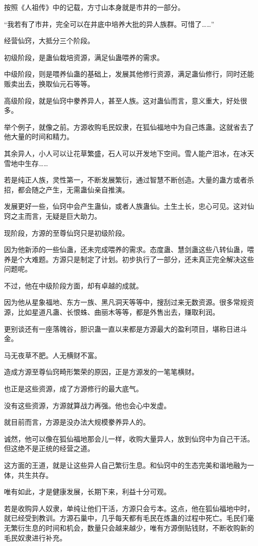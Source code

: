 \begin{this_body}
按照《人祖传》中的记载，方寸山本身就是市井的一部分。

“我若有了市井，完全可以在井底中培养大批的异人族群。可惜了……”

经营仙窍，大抵分三个阶段。

初级阶段，是蛊仙栽培资源，满足仙蛊喂养的需求。

中级阶段，则是喂养仙蛊的基础上，发展其他修行资源，满足蛊仙修行，同时还能贩卖出去，换取仙元石等等。

高级阶段，就是仙窍中豢养异人，甚至人族。这对蛊仙而言，意义重大，好处很多。

举个例子，就像之前。方源收购毛民奴隶，在狐仙福地中为自己炼蛊。这就省去了他大量的时间和精力。

其余异人，小人可以让花草繁盛，石人可以开发地下空间。雪人能产泪冰，在冰天雪地中生存……

若是纯正人族，灵性第一，不断发展繁衍，通过智慧不断创造。大量的蛊方或者杀招，都会随之产生，无需蛊仙亲自推演。

发展更好一些，仙窍中会产生蛊仙，或者人族蛊仙。土生土长，忠心可见。这对仙窍之主而言，无疑是巨大助力。

现阶段，方源的至尊仙窍只是初级阶段。

因为他新添的一些仙蛊，还未完成喂养的需求。态度蛊、慧剑蛊这些八转仙蛊，喂养是个大难题。方源只是制定了计划。初步执行了一部分，还未真正完全解决这些问题呢。

不过，他在中级阶段方面，却有卓越的成就。

因为他从星象福地、东方一族、黑凡洞天等等中，搜刮过来无数资源。很多常规资源，比如星道凡蛊、长恨蛛、曲丽木等等，都是外售出去，赚取利润。

更别谈还有一座落魄谷，胆识蛊一直以来都是方源最大的盈利项目，堪称日进斗金。

马无夜草不肥。人无横财不富。

造成方源至尊仙窍畸形繁荣的原因，正是方源发的一笔笔横财。

也正是这些资源，成了方源修行的最大底气。

没有这些资源，方源就算战力再强。他也会心中发虚。

就目前而言，方源是没办法大规模豢养异人的。

诚然，他可以像在狐仙福地那会儿一样，收购大量异人，放到仙窍中为自己干活。但这绝不是正统的经营之道。

这方面的王道，就是让这些异人自己繁衍生息。和仙窍中的生态完美和谐地融为一体，共生共存。

唯有如此，才是健康发展，长期下来，利益十分可观。

若是收购异人奴隶，单纯让他们干活，方源只会亏本。这点，他在狐仙福地中时，就已经受到教训。方源石巢中，几乎每天都有毛民在炼蛊的过程中死亡。毛民们毫无繁衍生息的时间和机会，数量只会越来越少，唯有方源倒贴钱财，不断收购新的毛民奴隶进行补充。


\end{this_body}
